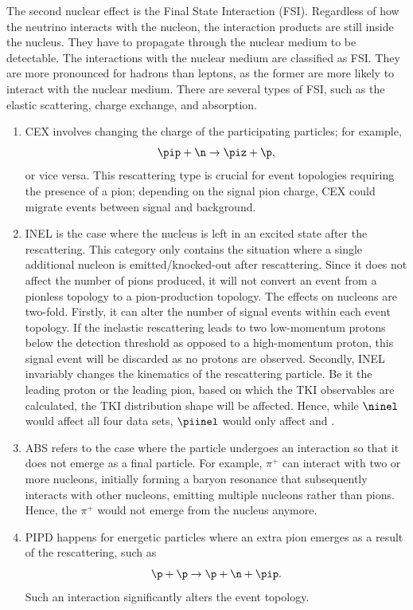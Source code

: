   \label{sec:nuint-fsi}
  The second nuclear effect is the Final State Interaction (FSI).
  Regardless of how the neutrino interacts with the nucleon, the interaction products are still inside the nucleus.
  They have to propagate through the nuclear medium to be detectable.
  The interactions with the nuclear medium are classified as FSI.
  They are more pronounced for hadrons than leptons, as the former are more likely to interact with the nuclear medium.
  There are several types of FSI, such as the elastic scattering, charge exchange, and absorption.
  \begin{enumerate}
      \item 
  CEX involves changing the charge of the participating particles; for example,
  \begin{equation}
      \pip + \n \rightarrow \piz + \p,
  \end{equation}
  or vice versa. This rescattering type is crucial for event topologies requiring the presence of a pion;  depending on the signal pion charge, CEX could migrate events between signal and background. 

  \item 
  INEL is the case where the nucleus is left in an excited state after the rescattering. This category only contains the situation where a single additional nucleon is emitted/knocked-out after rescattering. Since it does not affect the number of pions produced, it will not convert an event from a pionless topology to a pion-production topology. The effects on nucleons are two-fold. Firstly, it can alter the number of signal events within each event topology. If the inelastic rescattering leads to two low-momentum protons below the detection threshold as opposed to a high-momentum proton, this signal event will be discarded as no protons are observed. Secondly, INEL invariably changes the kinematics of the rescattering particle. Be it the leading proton or the leading pion, based on which the TKI observables are calculated, the TKI distribution shape will be affected. Hence, while $\ninel$ would affect all four data sets, $\piinel$ would only affect \ttkpip and \minpiz. 

  \item 
  ABS refers to the case where the particle undergoes an interaction so that it does not emerge as a final particle. For example, $\pi^+$ can interact with two or more nucleons, initially forming a baryon resonance that subsequently interacts with other nucleons, emitting multiple nucleons rather than pions. Hence, the $\pi^+$ would not emerge from the nucleus anymore.

  \item 
  PIPD happens for energetic particles where an extra pion emerges as a result of the rescattering, such as
  \begin{equation}
      \p + \p \rightarrow \p + \n + \pip.
  \end{equation}
  Such an interaction significantly alters the event topology. 

  \end{enumerate}




